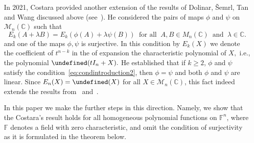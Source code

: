 \documentclass{elsarticle}
\let\det\undefined
\DeclareMathOperator{\det}{det}
\def\F{{\mathbb F}}
\def\M{{\mathcal M}}
\theoremstyle{definition}
\numberwithin{equation}{section}
\begin{document}
In 2021, Costara provided another extension of the results of Dolinar, \v{S}emrl, Tan and Wang discussed above (see~\cite{Costara2021}). He considered the pairs of maps $\phi$ and $\psi$ on $\M_{n}(\mathbb C)$ such that
\begin{equation}\label{eq:condintroduction2}
E_k (A + \lambda B) = E_k (\phi (A) + \lambda \psi (B))\;\;\mbox{for all}\;\;A, B \in M_{n}(\mathbb C)\;\;\mbox{and}\;\;\lambda \in \mathbb C.
\end{equation}
 and one of the maps $\phi, \psi$ is surjective. In this condition by $E_k(X)$ we denote the coefficient of $t^{n-k}$ in the of expansion the characteristic polynomial of $X,$ i.e., the polynomial $\det (tI_n + X).$ He established that if $k \ge 2$, $\phi$ and $\psi$ satisfy the condition~\eqref{eq:condintroduction2}, then $\phi = \psi$ and both $\phi$ and $\psi$ are linear. Since $E_{n}(X) = \det (X)$ for all $X \in \M_{n}(\mathbb C)$, this fact indeed extends the results from~\cite{Dolinar2002, TAN2003311} and~\cite{Costara2021}.


In this paper we make the further steps in this direction. Namely, we show that the Costara's result holds for all homogeneous polynomial functions on $\F^n$, where $\F$ denotes a field with zero characteristic, and omit the condition of surjectivity as it is formulated in the theorem below.
\end{document}
